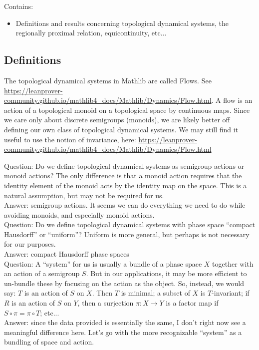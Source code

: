 Contains:
\begin{itemize}
    \item Definitions and results concerning topological dynamical systems, the regionally proximal relation, equicontinuity, etc...
\end{itemize}

\subsection{Definitions}

\begin{leanrmk}
    The topological dynamical systems in Mathlib are called Flows.  See \url{https://leanprover-community.github.io/mathlib4_docs/Mathlib/Dynamics/Flow.html}.  A flow is an action of a topological monoid on a topological space by continuous maps.  Since we care only about discrete semigroups (monoids), we are likely better off defining our own class of topological dynamical systems.  We may still find it useful to use the notion of invariance, here: \url{https://leanprover-community.github.io/mathlib4_docs/Mathlib/Dynamics/Flow.html}
\end{leanrmk}

\begin{leanrmk}
    Question: Do we define topological dynamical systems as semigroup actions or monoid actions?  The only difference is that a monoid action requires that the identity element of the monoid acts by the identity map on the space.  This is a natural assumption, but may not be required for us.\\
    
    Answer: semigroup actions.  It seems we can do everything we need to do while avoiding monoids, and especially monoid actions.\\

    Question: Do we define topological dynamical systems with phase space ``compact Hausdorff'' or ``uniform''?  Uniform is more general, but perhaps is not necessary for our purposes.\\
    
    Answer: compact Hausdorff phase spaces\\

    Question: A ``system'' for us is usually a bundle of a phase space $X$ together with an action of a semigroup $S$.  But in our applications, it may be more efficient to un-bundle these by focusing on the action as the object.  So, instead, we would say: $T$ is an action of $S$ on $X$.  Then $T$ is minimal; a subset of $X$ is $T$-invariant; if $R$ is an action of $S$ on $Y$, then a surjection $\pi: X \to Y$ is a factor map if $S \circ \pi = \pi \circ T$; etc...\\
    
    Answer: since the data provided is essentially the same, I don't right now see a meaningful difference here.  Let's go with the more recognizable ``system'' as a bundling of space and action.
\end{leanrmk}

